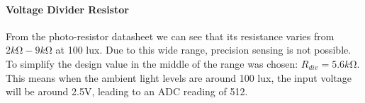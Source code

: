 \documentclass{article}
\begin{document}
\paragraph{Voltage Divider Resistor} From the photo-resistor datasheet we can see that its resistance varies from ~$2\si{k\ohm}-9\si{k\ohm}$\cite{ldr} at 100 lux. Due to this wide range, precision sensing is not possible. To simplify the design value in the middle of the range was chosen: $R_{div}=5.6\si{k\ohm}$. This means when the ambient light levels are around 100 lux, the input voltage will be around 2.5V, leading to an ADC reading of 512.




\end{document}
